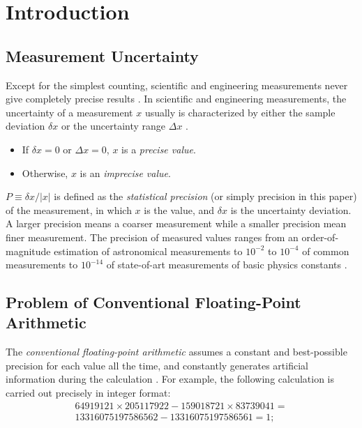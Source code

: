 \documentclass[twoside]{article}
\numberwithin{equation}{section}
\begin{document}
\clearpage
\section{Introduction}
\label{sec: introduction}

\subsection{Measurement Uncertainty}

Except for the simplest counting, scientific and engineering measurements never give completely precise results \cite{Statistical_Methods}\cite{Precisions_Physical_Measurements}. 
In scientific and engineering measurements, the uncertainty of a measurement $x$ usually is characterized by either the sample deviation $\delta x$ or the uncertainty range $\Delta x$ \cite{Statistical_Methods}\cite{Precisions_Physical_Measurements}.
\begin{itemize}
\item If $\delta x = 0$ or $\Delta x = 0$, $x$ is a \emph{precise value}.

\item Otherwise, $x$ is an \emph{imprecise value}.
\end{itemize}
 
$P \equiv \delta x / |x|$ is defined as the \emph{statistical precision} (or simply precision in this paper) of the measurement, in which $x$ is the value, and $\delta x$ is the uncertainty deviation.
A larger precision means a coarser measurement while a smaller precision mean finer measurement.
The precision of measured values ranges from an order-of-magnitude estimation of astronomical measurements to $10^{-2}$ to $10^{-4}$ of common measurements to $10^{-14}$ of state-of-art measurements of basic physics constants \cite{Basic_Constants_Measurements}.  



\subsection{Problem of Conventional Floating-Point Arithmetic}

The \emph{conventional floating-point arithmetic} \cite{Computer_Architecture}\cite{Floating_Point_Arithmetic}\cite{Floating_Point_Standard} assumes a constant and best-possible precision for each value all the time, and constantly generates artificial information during the calculation \cite{Arithmetic_Digital_Computers}.  
For example, the following calculation is carried out precisely in integer format:
\begin{multline}
\label{eqn: int num calc}
64919121 \times 205117922 - 159018721 \times 83739041=\\
13316075197586562 - 13316075197586561 = 1;
\end{multline}
\end{document}

